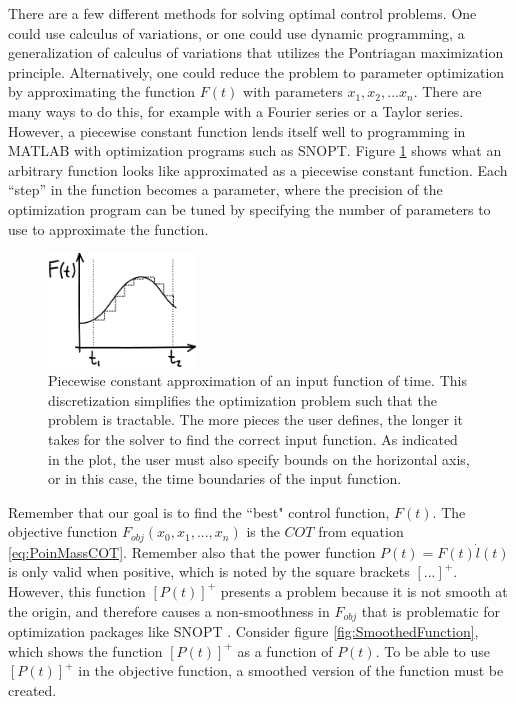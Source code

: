 
There are a few different methods for solving optimal control problems. One could use calculus of variations, or one could use dynamic programming, a generalization of calculus of variations that utilizes the Pontriagan maximization principle. Alternatively, one could reduce the problem to parameter optimization by approximating the function $F(t)$ with parameters $x_{1}, x_{2}, ... x_{n}$. There are many ways to do this, for example with a Fourier series or a Taylor series. However, a piecewise constant function lends itself well to programming in MATLAB with optimization programs such as SNOPT. Figure \ref{fig:PiecewiseConstant} shows what an arbitrary function looks like approximated as a piecewise constant function. Each ``step'' in the function becomes a parameter, where the precision of the optimization program can be tuned by specifying the number of parameters to use to approximate the function. 

\begin{figure}[h]		%
\begin{centering}
\includegraphics[width=0.35\textwidth]{Figures/PiecewiseConstant}\par
\end{centering}
\caption[Plot: Piecewise Constant Approximation of Input Function]{Piecewise constant approximation of an input function of time. This discretization simplifies the optimization problem such that the problem is tractable. The more pieces the user defines, the longer it takes for the solver to find the correct input function. As indicated in the plot, the user must also specify bounds on the horizontal axis, or in this case, the time boundaries of the input function.}
\label{fig:PiecewiseConstant}
\end{figure}
%

Remember that our goal is to find the ``best" control function, $F(t)$. The objective function $F_{obj}(x_{0}, x_{1}, \mbox{...}, x_{n})$ is the $COT$ from equation \ref{eq:PoinMassCOT}. Remember also that the power function $P(t)=F(t)\dot{l}(t)$ is only valid when positive, which is noted by the square brackets $[\mbox{...}]^{+}$. However, this function $[P(t)]^{+}$ presents a problem because it is not smooth at the origin, and therefore causes a non-smoothness in $F_{obj}$ that is problematic for optimization packages like SNOPT . Consider figure \ref{fig:SmoothedFunction}, which shows the function $[P(t)]^{+}$ as a function of $P(t)$. To be able to use $[P(t)]^{+}$ in the objective function, a smoothed version of the function must be created.


